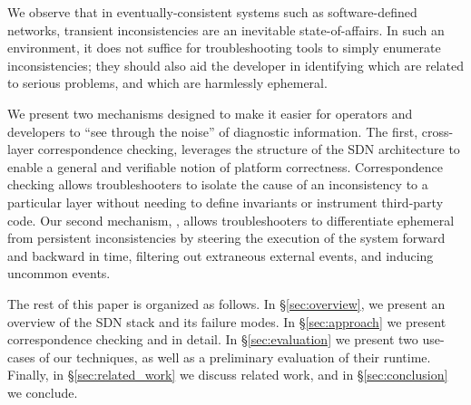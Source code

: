 We observe that in eventually-consistent systems such as software-defined
networks, transient inconsistencies are an inevitable state-of-affairs.
In such an environment, it does not suffice for troubleshooting tools to
simply enumerate inconsistencies; they should also aid the developer
in identifying which are related to serious problems, and which are
harmlessly ephemeral. 

We present two mechanisms designed to make it easier for operators and
developers to ``see through the noise'' of diagnostic information. The first,
cross-layer correspondence checking, leverages the structure of the SDN
architecture to enable a general and verifiable notion of platform
correctness. Correspondence checking allows troubleshooters to isolate the
cause of 
an inconsistency to a particular layer without needing to define invariants or
instrument third-party code. Our second
mechanism, \simulator, allows troubleshooters 
to differentiate ephemeral from persistent inconsistencies by steering the
execution of the system forward and backward in time, filtering out extraneous
external events, and inducing uncommon events. 

The rest of this paper is organized as follows. In \S\ref{sec:overview},
we present an overview of the SDN stack and its failure modes.
In \S\ref{sec:approach} we present correspondence checking and
\simulator in detail. In \S\ref{sec:evaluation} we present
two use-cases of our techniques, as well as a preliminary evaluation
of their runtime. Finally, in \S\ref{sec:related_work} we discuss related work,
and in \S\ref{sec:conclusion} we conclude.
